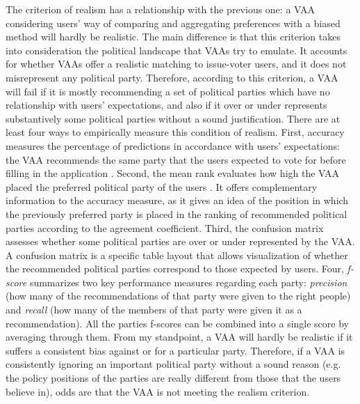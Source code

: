 \documentclass{scrartcl}
\begin{document}
The criterion of realism has a relationship with the previous one: a VAA considering users' way of comparing and aggregating preferences with a biased method will hardly be realistic. The main difference is that this criterion takes into consideration the political landscape that VAAs try to emulate. It accounts for whether VAAs offer a realistic matching to issue-voter users, and it does not misrepresent any political party. Therefore, according to this criterion, a VAA will fail if it is mostly recommending a set of political parties which have no relationship with users' expectations, and also if it over or under represents substantively some political parties without a sound justification. There are at least four ways to empirically measure this condition of realism. First, accuracy measures the percentage of predictions in accordance with users' expectations: the VAA recommends the same party that the users expected to vote for before filling in the application \cite{tsapatsoulis2015design}. Second, the mean rank evaluates how high the VAA placed the  preferred political party of the users \cite{tsapatsoulis2015design}. It offers complementary information to the accuracy measure, as it gives an idea of the position in which the previously preferred party is placed in the ranking of recommended political parties according to the agreement coefficient. Third, the confusion matrix assesses whether some political parties are over or under represented by the VAA. A confusion matrix is a specific table layout that allows visualization of whether the recommended political parties  correspond to those expected by users. Four, \textit{f-score} summarizes two key performance measures regarding each party: \textit{precision} (how many of the recommendations of that party were given to the right people) and \textit{recall} (how many of the members of that party were given it as a recommendation). All the parties f-scores can be combined into a single score by averaging through them. From my standpoint, a VAA will hardly be realistic if it suffers a consistent bias against or for a particular party. Therefore, if a VAA is consistently ignoring an important political party without a sound reason (e.g. the policy positions of the parties are really different from those that the users believe in), odds are that the VAA is not meeting the realism criterion.   
\\
\end{document}
